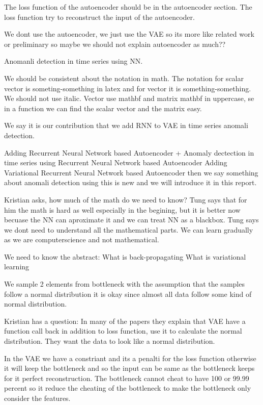 The loss function of the autoencoder should be in the autoencoder section. The loss function try to reconstruct the input of the autoencoder.

We dont use the autoencoder, we just use the VAE so its more like related work or preliminary so maybe we should not explain autoencoder as much??

Anomanli detection in time series using NN.

We should be consistent about the notation in math. The notation for scalar vector is someting-something in latex and for vector it is something-something. We should not use italic. Vector use mathbf and matrix mathbf in uppercase, se in a function we can find the scalar vector and the matrix easy.

We say it is our contribution that we add RNN to VAE in time series anomali detection. 

Adding Recurrent Neural Network based Autoencoder + Anomaly dectection in time series using  Recurrent Neural Network based Autoencoder Adding Variational Recurrent Neural Network based Autoencoder then we say something about anomali detection using this is new and we will introduce it in this report.


Kristian asks, how much of the math do we need to know?
Tung says that for him the math is hard as well especially in the begining, but it is better now becuase the NN can aproximate it and we can treat NN as a blackbox.
Tung says we dont need to understand all the mathematical parts. We can learn gradually as we are computerscience and not mathematical. 

We need to know the abstract:
What is back-propagating
What is variational learning

We sample 2 elements from bottleneck with the assumption that the samples follow a normal distribution it is okay since almost all data follow some kind of normal distribution.

Kristian has a question:
In many of the papers they explain that VAE have a function call back in addition to loss function, use it to calculate the normal distribution. They want the data to look like a normal distribution. 

In the VAE we have a constriant and its a penalti for the loss function otherwise it will keep the bottleneck and so the input can be same as the bottleneck keeps for it perfect reconstruction. The bottleneck cannot cheat to have 100 or 99.99 percent so it reduce the cheating of the bottleneck to make the bottleneck only consider the features. 

